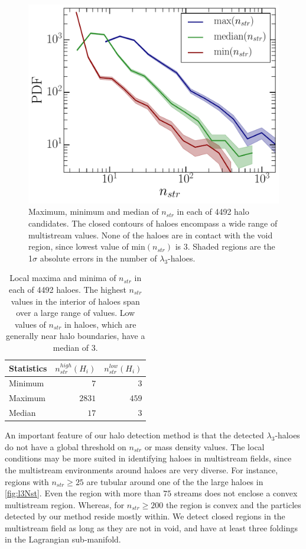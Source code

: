 \begin{figure}
\begin{minipage}[t]{.99\linewidth}
 \centering\includegraphics[width=10.cm]{Chapter5/Source_v2/fig8.pdf} 
\end{minipage}\hfill
\caption{Maximum, minimum and median of $n_{str}$ in each of 4492 halo candidates. The closed contours of haloes encompass a wide range of multistream values. None of the haloes are in contact with the void region, since lowest value of min$(n_{str})$ is 3. Shaded regions are the 1$\sigma$ absolute errors in the number of $\lambda_3$-haloes. }
\label{fig:minmaxstr}
\end{figure}


\begin{table}
\centering
\caption{Local maxima and minima of $n_{str}$ in each of 4492 haloes. The highest $n_{str}$ values in the interior of haloes span over a large range of values. Low values of $n_{str}$ in haloes, which are generally near halo boundaries, have a median of 3.}
\begin{tabular}{|l|r|r|}
\hline
Statistics  &  $n_{str}^{high}(H_i)$ & $n_{str}^{low}(H_i)$ \\ \hline
Minimum     & $7$    & $3$  \\ \hline
Maximum     & $2831$ & $459$      \\ \hline
Median      & $17$   & $3$   \\ \hline
\end{tabular}
\label{tab:minmaxstr}
\end{table}


An important feature of our halo detection method is that the detected $\lambda_3$-haloes do not have a global threshold on $n_{str}$ or mass density values. The local conditions may be more suited in identifying haloes in multistream fields, since the multistream environments around haloes are very diverse. For instance, regions with $n_{str} \geq 25$ are tubular around one of the the large haloes in \autoref{fig:l3Nst}. Even the region with more than $75$ streams does not enclose a convex multistream region. Whereas, for $n_{str} \geq 200$ the region is convex and the particles detected by our method reside mostly within. We detect closed regions in the multistream field as long as they are not in void, and have at least three foldings in the Lagrangian sub-manifold.

